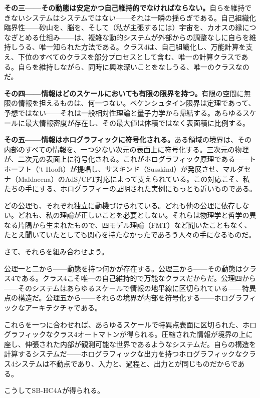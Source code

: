 \documentclass[11pt, twoside, openright]{book}
\begin{document}
\textbf{その三------その動態は安定かつ自己維持的でなければならない。}自らを維持できないシステムはシステムではない------それは一瞬の揺らぎである。自己組織化臨界性------砂山を、脳を、そして（私が主張するには）宇宙を、カオスの縁につなぎとめる仕組み------は、複雑な動的システムが外部からの調整なしに自らを維持しうる、唯一知られた方法である。クラス4は、自己組織化し、万能計算を支え、下位のすべてのクラスを部分プロセスとして含む、唯一の計算クラスである。自らを維持しながら、同時に興味深いことをなしうる、唯一のクラスなのだ。

\textbf{その四------情報はどのスケールにおいても有限の限界を持つ。}有限の空間に無限の情報を担えるものは、何一つない。ベケンシュタイン限界は定理であって、予想ではない------それは一般相対性理論と量子力学から帰結する。あらゆるスケールに最大情報密度が存在し、その最大値は体積ではなく表面積に比例する。

\textbf{その五------情報はホログラフィックに符号化される。}ある領域の境界は、その内部のすべての情報を、一つ少ない次元の表面上に符号化する。三次元の物理が、二次元の表面上に符号化される。これがホログラフィック原理である------トホーフト（'t Hooft）が提唱し、サスキンド（Susskind）が発展させ、マルダセナ（Maldacena）のAdS/CFT対応によって支えられている。この対応こそ、私たちの手にする、ホログラフィーの証明された実例にもっとも近いものである。

どの公理も、それぞれ独立に動機づけられている。どれも他の公理に依存しない。どれも、私の理論が正しいことを必要としない。それらは物理学と哲学の異なる片隅から生まれたもので、四モデル理論（FMT）など聞いたこともなく、たとえ聞いていたとしても関心を持たなかったであろう人々の手になるものだ。

さて、それらを組み合わせよう。

公理一と二から------動態を持つ何かが存在する。公理三から------その動態はクラス4である。クラス4こそ唯一の自己維持的で万能なクラスだからだ。公理四から------そのシステムはあらゆるスケールで情報の地平線に区切られている------特異点の構造だ。公理五から------それらの境界が内部を符号化する------ホログラフィックなアーキテクチャである。

これらを一つに合わせれば、あらゆるスケールで特異点表面に区切られた、ホログラフィックなクラス4オートマトンが得られる。圧縮された情報が境界の上に座し、伸張された内部が観測可能な世界であるようなシステムだ。自らの構造を計算するシステムだ------ホログラフィックな出力を持つホログラフィックなクラス4システムは不動点であり、入力と、過程と、出力とが同じものだからである。

こうしてSB-HC4Aが得られる。
\end{document}
